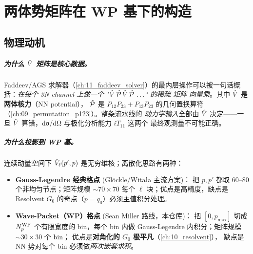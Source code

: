 
\chapter{两体势矩阵在 WP 基下的构造}
\label{ch:08_potential_matrix}

\section{物理动机}
\label{sec:ch08-motivation}

\paragraph{为什么 \(\hat{V}\) 矩阵是核心数据。}
Faddeev/AGS 求解器（\cref{ch:11_faddeev_solver}）的最内层操作可以被一句话概
括：\emph{在每个 3N-channel 上做一个 "\(\hat{V}\,\hat{\mathcal{P}}\,\hat{V}\,\hat{\mathcal{P}}\,\ldots\)" 的稀疏
矩阵-向量乘}。其中 \(\hat{V}\) 是\textbf{两体核力}（NN potential），
\(\hat{\mathcal{P}}\) 是 \(P_{12}P_{23} + P_{13}P_{23}\) 的几何置换算符
（\cref{ch:09_permutation_p123}）。整条流水线的 \emph{动力学输入}全部由
\(\hat{V}\) 决定——一旦 \(\hat{V}\) 算错，dσ/dΩ 与极化分析能力 \(iT_{11}\) 这两个
最终观测量不可能正确。

\paragraph{为什么投影到 WP 基。}
连续动量空间下 \(\hat{V}_\ell(p', p)\) 是无穷维核；离散化思路有两种：

\begin{itemize}
  \item \textbf{Gauss-Legendre 经典格点} (Glöckle/Witała 主流方案)：
        把 \(p, p'\) 都取 60--80 个非均匀节点；矩阵规模 \(\sim 70 \times 70\)
        每个 \(\ell\) 块；优点是高精度，缺点是 Resolvent
        \(G_0\) 的奇点（\(p = q_0\)）必须主值积分处理。
  \item \textbf{Wave-Packet（WP）格点} (Sean Miller 路线，本仓库)：
        把 \([0, p_{\max}]\) 切成 \({N_{p}^{\text{WP}}}\) 个有限宽度的 bin，每个 bin 内做
        Gauss-Legendre 内积分；矩阵规模 \(\sim 30 \times 30\) 个 bin；
        优点是\textbf{对角化的 \(G_0\) 极平凡}（\cref{ch:10_resolvent}），
        缺点是 NN 势对每个 bin 必须做\emph{两次嵌套求积}。
\end{itemize}

